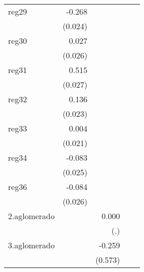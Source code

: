 {\begin{longtable}{l*{4}{D{.}{.}{-1}}}
\addlinespace
reg29       &      -0.268\sym{***}&                     &                     &                     \\
            &     (0.024)         &                     &                     &                     \\
\addlinespace
reg30       &       0.027         &                     &                     &                     \\
            &     (0.026)         &                     &                     &                     \\
\addlinespace
reg31       &       0.515\sym{***}&                     &                     &                     \\
            &     (0.027)         &                     &                     &                     \\
\addlinespace
reg32       &       0.136\sym{***}&                     &                     &                     \\
            &     (0.023)         &                     &                     &                     \\
\addlinespace
reg33       &       0.004         &                     &                     &                     \\
            &     (0.021)         &                     &                     &                     \\
\addlinespace
reg34       &      -0.083\sym{**} &                     &                     &                     \\
            &     (0.025)         &                     &                     &                     \\
\addlinespace
reg36       &      -0.084\sym{**} &                     &                     &                     \\
            &     (0.026)         &                     &                     &                     \\
\addlinespace
2.aglomerado&                     &       0.000         &                     &                     \\
            &                     &         (.)         &                     &                     \\
\addlinespace
3.aglomerado&                     &      -0.259         &                     &                     \\
            &                     &     (0.573)         &                     &                     \\

\end{longtable}}
